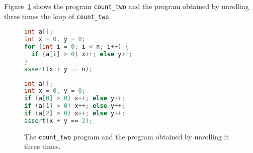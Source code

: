 %
Figure~\ref{fig:examples/count_two} shows the
program \verb'count_two' and the program obtained by unrolling three times the loop of \verb'count_two'.

\begin{figure}[h]
\begin{minipage}{.52\textwidth}
  {\begin{lstlisting}[language=cpp]
int a[];
int x = 0, y = 0;
for (int i = 0; i < n; i++) {
  if (a[i] > 0) x++; else y++;
}
assert(x + y == n);
\end{lstlisting}}
\end{minipage}%
\hspace{1pt}
\begin{minipage}{.48\textwidth}
  {\begin{lstlisting}[language=cpp]
int a[];
int x = 0, y = 0;
if (a[0] > 0) x++; else y++;
if (a[1] > 0) x++; else y++;
if (a[2] > 0) x++; else y++;
assert(x + y == 3);
\end{lstlisting}}
\end{minipage}
  \caption{The \texttt{count\_two} program and the program obtained by unrolling it three times.}
  \label{fig:examples/count_two}
\end{figure}

